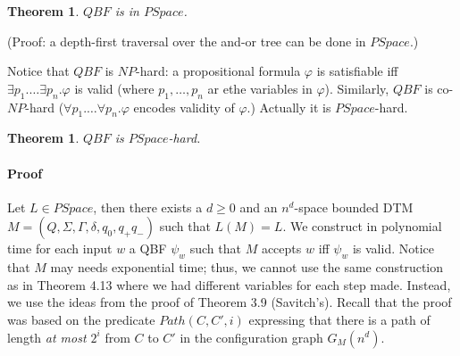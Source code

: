 \documentclass{report}
\newcommand{\NP}{\text{$\mathit{NP}$}}
\newtheorem{theorem}[definition]{Theorem}
\begin{document}
\begin{theorem} $QBF$ is in $PSpace$.
\end{theorem}
(Proof: a depth-first traversal over the and-or tree can be done in $PSpace$.)

Notice that $QBF$ is $\NP$-hard: a propositional formula $\varphi$ is satisfiable iff $\exists p_1. \ldots \exists p_n.\varphi$ is valid (where $p_1,\ldots, p_n$ ar ethe variables in $\varphi$). Similarly, $QBF$ is co-$NP$-hard ($\forall p_1. \ldots \forall p_n.\varphi$ encodes validity of $\varphi$.) Actually it is $PSpace$-hard. 

\begin{theorem} $QBF$ is $PSpace$-hard.
\end{theorem}

\paragraph{Proof} Let $L \in PSpace$, then there exists a $d \geq 0$ and an $n^d$-space bounded DTM $M = (Q, \Sigma, \Gamma, \delta, q_0, q_+ q_-)$ such that $L(M) = L$. We construct in polynomial time for each input $w$ a QBF $\psi_w$ such that $M$ accepts $w$ iff $\psi_w$ is valid. Notice that $M$ may needs exponential time; thus, we cannot use the same construction as in Theorem 4.13 where we had different variables for each step made. Instead, we use the ideas from the proof of Theorem 3.9 (Savitch's). Recall that the proof was based on the predicate $Path(C,C',i)$ expressing that there is a path of length \emph{at most $2^i$} from $C$ to $C'$ in the configuration graph $G_M(n^d)$. 
\end{document}
